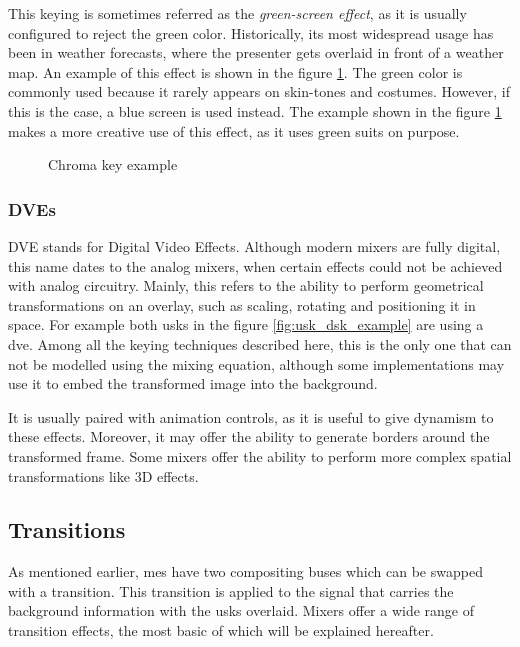 \documentclass[../main.tex]{subfiles}
\begin{document}
This keying is sometimes referred as the \textit{green-screen effect}, as it is usually configured to reject the green color\cite{OrtizRodriguez2018}. Historically, its most widespread usage has been in weather forecasts, where the presenter gets overlaid in front of a weather map. An example of this effect is shown in the figure \ref{fig:chroma_key_example}. The green color is commonly used because it rarely appears on skin-tones and costumes. However, if this is the case, a blue screen is used instead. The example shown in the figure \ref{fig:chroma_key_example} makes a more creative use of this effect, as it uses green suits on purpose.\newline

\begin{figure}[htbp]
    \centering

    \caption{Chroma key example}
    \label{fig:chroma_key_example}
\end{figure}

\subsubsection{DVEs}
DVE stands for Digital Video Effects. Although modern mixers are fully digital, this name dates to the analog mixers, when certain effects could not be achieved with analog circuitry. Mainly, this refers to the ability to perform geometrical transformations on an overlay, such as scaling, rotating and positioning it in space. For example both \glspl{usk} in the figure \ref{fig:usk_dsk_example} are using a \gls{dve}. Among all the keying techniques described here, this is the only one that can not be modelled using the mixing equation, although some implementations may use it to embed the transformed image into the background\cite{OrtizRodriguez2018}.\newline

It is usually paired with animation controls, as it is useful to give dynamism to these effects. Moreover, it may offer the ability to generate borders around the transformed frame\cite{atemManual}. Some mixers offer the ability to perform more complex spatial transformations like 3D effects\cite{xvsManual}.\newline

\subsection{Transitions}
As mentioned earlier, \glspl{me} have two compositing buses which can be swapped with a transition. This transition is applied to the signal that carries the background information with the \glspl{usk} overlaid. Mixers offer a wide range of transition effects, the most basic of which will be explained hereafter.\newline
\end{document}
